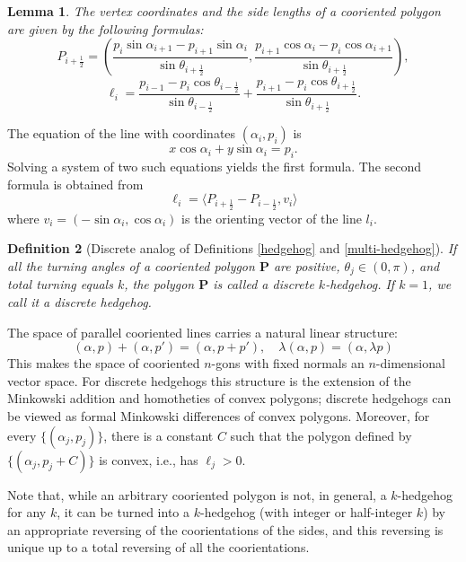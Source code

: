 \documentclass[12pt]{article}
\makeatletter
\newtheorem{lemma}{Lemma}[section]
\newtheorem{definition}[lemma]{Definition}
\renewenvironment{proof}[1][\proofname] 
{\par\pushQED{\qed}\normalfont\topsep6\p@\@plus6\p@\relax\trivlist\item[\hskip\labelsep\bfseries#1\@addpunct{.}]\ignorespaces}{\popQED\endtrivlist\@endpefalse}
\renewcommand{\P}{\mathbf{P}}
\makeatother
\begin{document}
\begin{lemma}
\label{CoordPolygon}
The vertex coordinates and the side lengths of a cooriented polygon are given by the following formulas:
\begin{equation}
\label{vertexcoord}
P_{i+\frac12}=\left(\frac{p_i \sin \alpha_{i+1} - p_{i+1} \sin \alpha_i}{\sin \theta_{i+\frac12}}, \frac{p_{i+1} \cos \alpha_i - p_i \cos \alpha_{i+1}}{\sin\theta_{i+\frac12}}\right),
\end{equation}
\begin{equation}
\label{lengths}
\ell_i = \frac{p_{i-1} - p_i\cos\theta_{i-\frac12}}{\sin\theta_{i-\frac12}} + \frac{p_{i+1} - p_i\cos\theta_{i+\frac12}}{\sin\theta_{i+\frac12}}.
\end{equation}
\end{lemma}
\begin{proof}
The equation of the line with coordinates $(\alpha_i, p_i)$ is
\[ x\cos\alpha_i+y\sin\alpha_i=p_i. \]
Solving a system of two such equations yields the first formula. The second formula is obtained from
\[ \ell_i = \langle P_{i+\frac12} - P_{i-\frac12}, v_i \rangle \]
where $v_i = (-\sin\alpha_i, \cos\alpha_i)$ is the orienting vector of the line $l_i$.
\end{proof}

\begin{definition}[Discrete analog of Definitions \ref{hedgehog} and
\ref{multi-hedgehog}]
\label{discrete_hedgehog}
If all the turning angles of a cooriented polygon $\P$ are positive, $\theta_j \in (0,\pi)$, and total turning equals $k$, the  polygon $\P$ is called a \emph{discrete $k$-hedgehog}. If $k=1$, we call it a \emph{discrete hedgehog}. 
\end{definition}

The space of parallel cooriented lines carries a natural linear structure:
\[(\alpha, p) + (\alpha, p') = (\alpha, p+p'), \quad \lambda(\alpha, p) = (\alpha, \lambda p)\]
This makes the space of cooriented $n$-gons with fixed normals an $n$-dimension\-al vector space. For discrete hedgehogs this structure is the extension of the Minkowski addition and homotheties of convex polygons; discrete hedgehogs can be viewed as formal Minkowski differences of convex polygons. Moreover, for every $\{(\alpha_j, p_j)\}$, there is a constant $C$ such that the polygon defined by $\{(\alpha_j, p_j +C)\}$ is convex, i.e., has $\ell_j > 0$.

Note that, while an arbitrary cooriented polygon is not, in general, a $k$-hedgehog for any $k$, it can be turned into a $k$-hedgehog (with integer or half-integer $k$) by an appropriate reversing of the coorientations of the sides, and this reversing is unique up to a total reversing of all the coorientations.
\end{document}
